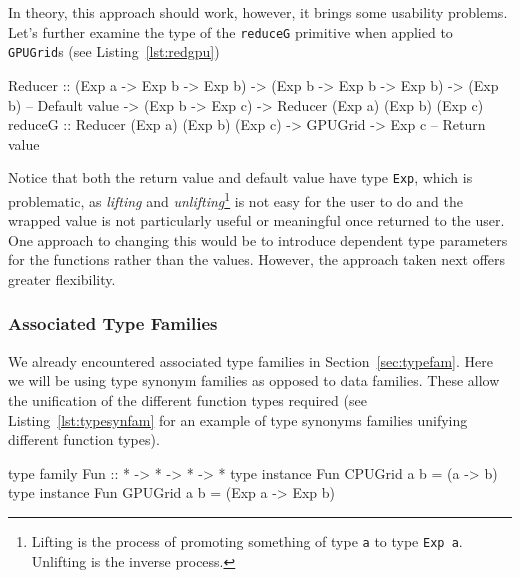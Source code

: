 \documentclass[12pt,a4paper,twoside]{scrbook}
\begin{document}
In theory, this approach should work, however, it brings some usability
problems. Let's further examine the type of the \texttt{reduceG} primitive
when applied to \texttt{GPUGrid}s (see Listing~\ref{lst:redgpu})

\begin{hflisting}[label={lst:redgpu}, caption={The type of the reducer once the
    Accelerate types are applied.}]
Reducer :: (Exp a -> Exp b -> Exp b)
        -> (Exp b -> Exp b -> Exp b)
        -> (Exp b) -- Default value
        -> (Exp b -> Exp c)
        -> Reducer (Exp a) (Exp b) (Exp c)
reduceG :: Reducer (Exp a) (Exp b) (Exp c)
        -> GPUGrid
        -> Exp c -- Return value
\end{hflisting}

Notice that both the return value and default value have type \texttt{Exp},
which is problematic, as \emph{lifting} and \emph{unlifting}\footnote{Lifting is
  the process of promoting something of type \texttt{a} to type \texttt{Exp
    a}. Unlifting is the inverse process.}  is not easy for the user to do and
the wrapped value is not particularly useful or meaningful once returned to the
user. One approach to changing this would be to introduce dependent type
parameters for the functions rather than the values. However, the approach taken
next offers greater flexibility.

\subsubsection{Associated Type Families}
\label{sec:assoctypefam}

We already encountered associated type families in
Section~\ref{sec:typefam}. Here we will be using type synonym families as
opposed to data families. These allow the unification of the different function
types required (see Listing~\ref{lst:typesynfam} for an example of type synonyms
families unifying different function types).

\begin{hflisting}[label=lst:typesynfam, caption=The type synonym family is used
  as a type function. It is used to work out the element type of a collection.
  Here the \texttt{Fun} family (representing a one-argument function) can take
  two forms depending on the compilation target.]

type family Fun :: * -> * -> * -> *
type instance Fun CPUGrid a b = (a -> b)
type instance Fun GPUGrid a b = (Exp a -> Exp b)

\end{hflisting}
\end{document}

